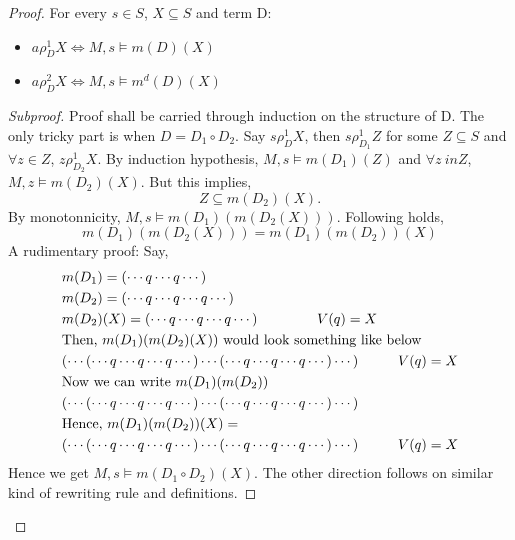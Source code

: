 \documentclass[10pt]{article}
\begin{document}
\begin{proof}
			For every $s\in S$, $X\subseteq S$ and term D:
			\begin{itemize}
				\item $a\rho_D^1 X \Longleftrightarrow M,s \models m(D)(X)$
				\item $a\rho_D^2 X \Longleftrightarrow M,s \models m^d(D)(X)$
			\end{itemize}
			\begin{proof}[Subproof]\renewcommand{\qedsymbol}{$\dashv$}
				Proof shall be carried through induction on the structure of D. The only tricky part is when $D=D_1\circ D_2$. Say $s\rho_D^1X$, then $s\rho_{D_1}^1Z$ for some $Z\subseteq S$ and  $\forall z \in Z$, $z\rho_{D_2}^1X$. By induction hypothesis, $M,s \models m(D_1)(Z)$ and $\forall z\ in Z$, $M, z \models m(D_2)(X)$. But this implies,
				\[
				Z \subseteq m(D_2)(X).
				\]
				By monotonnicity, $M,s \models m(D_1)(m(D_2(X)))$. Following holds, 
				\[
				m(D_1)(m(D_2(X))) = m(D_1)(m(D_2))(X)
				\]
				A rudimentary proof:
				Say,
				\[
				\begin{split}
					&m(D_1) = (\cdots q \cdots q \cdots) \\
					&m(D_2) = (\cdots q \cdots q \cdots q \cdots) \\
					&m(D_2)(X) = (\cdots q \cdots q \cdots q \cdots) \hspace{1.5cm} V(q) = X\\
					&\text{Then, } m(D_1)(m(D_2)(X)) \text{ would look something like below} \\
					&(\cdots (\cdots q \cdots q \cdots q \cdots) \cdots (\cdots q \cdots q \cdots q \cdots) \cdots) \hspace{1cm } V(q) = X \\
					&\text{Now we can write } m(D_1)(m(D_2)) \\
					& (\cdots (\cdots q \cdots q \cdots q \cdots) \cdots (\cdots q \cdots q \cdots q \cdots) \cdots) \\
					&\text{Hence, }m(D_1)(m(D_2))(X) = \\
					& (\cdots (\cdots q \cdots q \cdots q \cdots) \cdots (\cdots q \cdots q \cdots q \cdots) \cdots) \hspace{1cm } V(q) = X \\
				\end{split}
				\]
				Hence we get $M,s \models m(D_1 \circ D_2)(X)$. The other direction follows on similar kind of rewriting rule and definitions. 
			\end{proof}
			 
		\end{proof}
		
\end{document}
